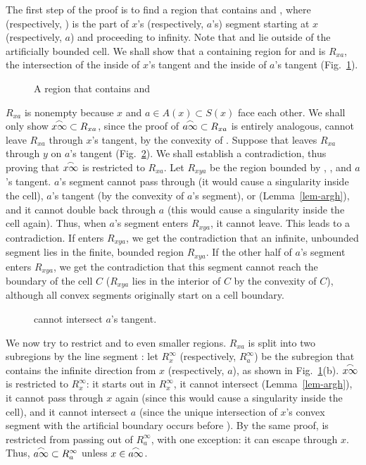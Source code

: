The first step of the proof is to find a region that contains
 and , where  (respectively, 
) is the part of
$x$'s (respectively, $a$'s) segment starting at $x$ (respectively, $a$) 
and proceeding to infinity.
Note that  and  lie outside of the artificially bounded cell.
We shall show that a containing region for  and  is 
$R_{xa}$, the intersection of the inside of $x$'s tangent and the inside of $a$'s tangent 
(Fig.~\ref{fig-ax}).
%
\begin{figure}[tbp]\vspace{2in}\caption{A region that contains 
 and }\label{fig-ax}\end{figure}
%
$R_{xa}$ is nonempty because $x$ and $a \in A(x) \subset S(x)$ face each other.
We shall only show $\mbox{$\stackrel{\frown}{x\infty}$} \subset R_{xa}$, since the proof of 
$\mbox{$\stackrel{\frown}{a\infty}$} \subset R_{xa}$ is entirely analogous, 
 cannot leave $R_{xa}$ through $x$'s tangent, 
by the convexity of .
Suppose that  leaves $R_{xa}$ through
$y$ on $a$'s tangent (Fig.~\ref{fig.chick}).
We shall establish a contradiction, thus proving that $\mbox{$\stackrel{\frown}{x\infty}$}$ is restricted
to $R_{xa}$.
Let $R_{xya}$ be the region bounded by , , and $a$'s tangent.
$a$'s segment cannot pass through 
(it would cause a singularity inside the cell), $a$'s tangent (by 
the convexity of $a$'s segment), or  (Lemma~\ref{lem-argh}),
and it cannot double back through $a$
(this would cause a singularity inside the cell again).
Thus, when $a$'s segment enters $R_{xya}$, it cannot leave.
This leads to a contradiction.
If  enters $R_{xya}$, we get the contradiction that an infinite, 
unbounded segment lies in the finite, bounded region $R_{xya}$.
If the other half of $a$'s segment enters $R_{xya}$,
we get the contradiction that this segment cannot reach the boundary of the 
cell $C$ ($R_{xya}$ lies in the interior of $C$ by the convexity of $C$), 
although all convex segments originally start on a cell boundary.

\begin{figure}[bp]\vspace{2in}\caption{ cannot 
intersect $a$'s tangent.}\label{fig.chick}\end{figure}

We now try to restrict  and  to even smaller regions.
$R_{xa}$ is split into two subregions by the line segment :
let $R_{x}^{\infty}$ (respectively, $R_{a}^{\infty}$) be the subregion that contains 
the infinite direction from $x$ (respectively, $a$), as shown in Fig.~\ref{fig-ax}(b).
$\mbox{$\stackrel{\frown}{x\infty}$}$ is restricted to $R_{x}^{\infty}$:
it starts out in $R_{x}^{\infty}$, it cannot intersect 
(Lemma~\ref{lem-argh}), 
it cannot pass through $x$ again (since this would cause
a singularity inside the cell),
and it cannot intersect $a$ (since the unique intersection of $x$'s convex segment 
with the artificial boundary occurs before ).
By the same proof,  is restricted from passing out of $R_{a}^{\infty}$,
with one exception: it can escape through $x$.
Thus, $\mbox{$\stackrel{\frown}{a\infty}$} \subset R_{a}^{\infty}$ unless $x \in \mbox{$\stackrel{\frown}{a\infty}$}$.

